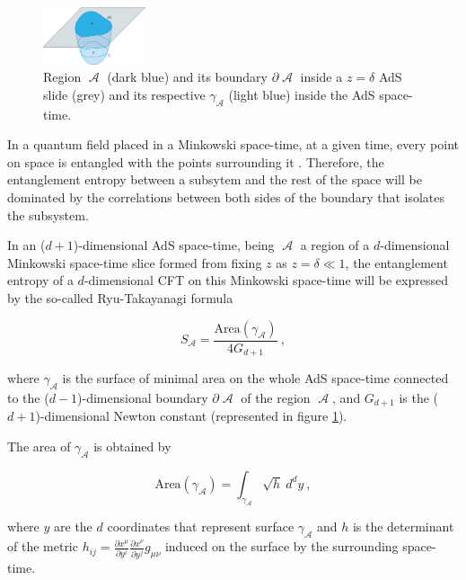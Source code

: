 \documentclass[lettersize,journal]{IEEEtran}
\providecommand{\eq}[2]{
    \begin{equation}
        #2
    \label{eq:#1}
    \end{equation}
}
\DeclareMathOperator{\calA}{\mathcal{A}}
\begin{document}
\begin{figure}
    \centering
    \includegraphics[width=0.27\textwidth]{../Imatges/Extern/EE_AdS-CFT.png}
\caption{Region $\calA$ (dark blue) and its boundary $\partial \calA$ inside a $z=\delta$ AdS slide (grey) and its respective $\gamma_{\calA}$ (light blue) inside the AdS space-time.}
\label{fig:EE_AdS-CFT}
\end{figure}

In a quantum field placed in a Minkowski space-time, at a given time, every point on space is entangled with the points surrounding it \cite{nishioka_entanglement_2018}. Therefore, the entanglement entropy between a subsytem and the rest of the space will be dominated by the correlations between both sides of the boundary that isolates the subsystem.



In an ($d+1$)-dimensional AdS space-time, being $\calA$ a region of a $d$-dimensional Minkowski space-time slice formed from fixing $z$ as $z=\delta \ll 1$, the entanglement entropy of a $d$-dimensional CFT on this Minkowski space-time will be expressed by the so-called Ryu-Takayanagi formula
\eq{EE_RT}{
    S_{\calA} = \frac{ \text{Area}(\gamma_{\calA}) }{ 4 G_{d+1} } \ ,
}
\cite{ryu_holographic_2008} where $\gamma_{\calA}$ is the surface of minimal area on the whole AdS space-time connected to the ($d-1$)-dimensional boundary $\partial \calA$ of the region $\calA$, and $G_{d+1}$ is the ($d+1$)-dimensional Newton constant (represented in figure \ref{fig:EE_AdS-CFT}).

The area of $\gamma_{\calA}$ is obtained by
\eq{EE_RT-area}{
    \text{Area}(\gamma_{\calA}) = \int_{\gamma_{\calA}} \sqrt{h} \ d^{d}y \ ,
}
where $y$ are the $d$ coordinates that represent surface $\gamma_{\calA}$ and $h$ is the determinant of the metric $h_{ij} = \frac{\partial x^\mu}{\partial y^i} \frac{\partial x^\nu}{\partial y^j} g_{\mu\nu}$ induced on the surface by the surrounding space-time.
\end{document}
